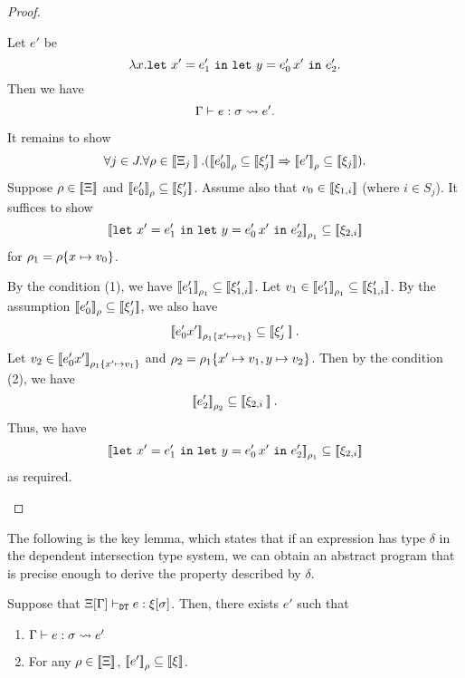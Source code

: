 \begin{proof}
\begin{itemize}
Let \(e'\) be
\[\lambda x.\mathtt{let~}x'=e_1'\mathtt{~in~}\mathtt{let~}y=e_0'\,x'\mathtt{~in~}{e_2'}.\]
Then we have
\[\Gamma \vdash e : \sigma \leadsto e'.\]

It remains to show
\[\forall j\in J.\forall\env\in \sem{\Xi_j}.
(\esem{e_0'}{\env}\subseteq \sem{\xi_j'}\imply \esem{e'}{\env}\subseteq \sem{\xi_j}).\]
Suppose \(\rho\in \mathbin{[\![}\Xi\mathbin{]\!]}\) and \(\mathbin{[\![}e_0'\mathbin{]\!]}_{\rho}\subseteq \mathbin{[\![}\xi_j'\mathbin{]\!]}\).
Assume also that \(v_0\in \mathbin{[\![}\xi_{1,i}\mathbin{]\!]}\) (where \(i\in S_j\)).
It suffices to show 
\[\mathbin{[\![}\mathtt{let~}x'=e_1'\mathtt{~in~}\mathtt{let~}y=e_0'\,x'\mathtt{~in~}{e_2'}\mathbin{]\!]}_{\rho_1} \subseteq \mathbin{[\![}\xi_{2,i}\mathbin{]\!]}\]
for \(\rho_1 = \rho\{x\mapsto v_0\}\).

By the condition (1), we have \(\mathbin{[\![}e_1'\mathbin{]\!]}_{\rho_1}\subseteq \mathbin{[\![}\xi_{1,i}'\mathbin{]\!]}\).
Let \(v_1\in \mathbin{[\![}e_1'\mathbin{]\!]}_{\rho_1}\subseteq \mathbin{[\![}\xi_{1,i}'\mathbin{]\!]}\).
By the assumption \(\mathbin{[\![}e_0'\mathbin{]\!]}_{\rho}\subseteq \mathbin{[\![}\xi_j'\mathbin{]\!]}\),
we also have 
\[\mathbin{[\![}e_0'x'\mathbin{]\!]}_{\rho_1\{x'\mapsto v_1\}}\subseteq \mathbin{[\![}\xi_j'\mathbin{]\!]}.\]
Let \(v_2\in \mathbin{[\![}e_0'x'\mathbin{]\!]}_{\rho_1\{x'\mapsto v_1\}}\)
and \(\rho_2 = \rho_1\{x'\mapsto v_1,y\mapsto v_2\}\).
Then by the condition (2), we have
\[
\mathbin{[\![}e_2'\mathbin{]\!]}_{\rho_2}\subseteq \mathbin{[\![}\xi_{2,i}\mathbin{]\!]}.
\]
Thus, we have
\[\mathbin{[\![}\mathtt{let~}x'=e_1'\mathtt{~in~}\mathtt{let~}y=e_0'\,x'\mathtt{~in~}{e_2'}\mathbin{]\!]}_{\rho_1} \subseteq \mathbin{[\![}\xi_{2,i}\mathbin{]\!]}\]
as required.
\end{itemize}
\end{proof}

The following is the key lemma, which states that if an expression has type \(\delta\) in
the dependent intersection type system, we can obtain an abstract program that is precise enough
to derive the property described by \(\delta\).
\begin{lemma}
\label{lem:relcomp-main}
Suppose that \(\Xi[\Gamma] \vdash_{\texttt{DT}} e: \xi[\sigma]\).
Then, there exists \(e'\) such that
\begin{enumerate}
\item \(\Gamma \vdash e : \sigma \leadsto e'\)
\item For any \(\rho\in \mathbin{[\![}\Xi\mathbin{]\!]}\),
    \(\mathbin{[\![}e'\mathbin{]\!]}_{\rho}\subseteq \mathbin{[\![}\xi\mathbin{]\!]}\).
\end{enumerate}
\end{lemma}

